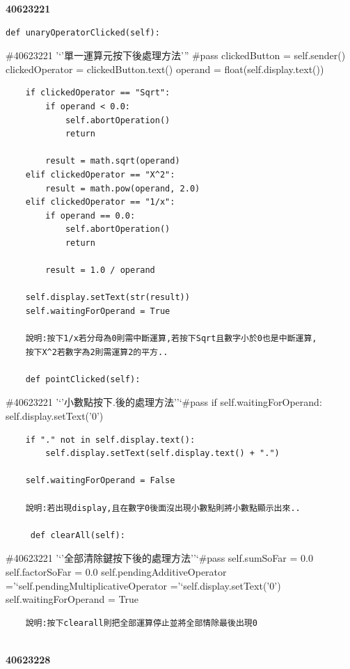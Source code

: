 \documentclass[12pt,,]{report}
\begin{document}
\textbf{40623221}

\begin{verbatim}
def unaryOperatorClicked(self):
\end{verbatim}

\#40623221 '`'單一運算元按下後處理方法''' \#pass clickedButton =
self.sender() clickedOperator = clickedButton.text() operand =
float(self.display.text())

\begin{verbatim}
    if clickedOperator == "Sqrt":
        if operand < 0.0:
            self.abortOperation()
            return

        result = math.sqrt(operand)
    elif clickedOperator == "X^2":
        result = math.pow(operand, 2.0)
    elif clickedOperator == "1/x":
        if operand == 0.0:
            self.abortOperation()
            return

        result = 1.0 / operand

    self.display.setText(str(result))
    self.waitingForOperand = True
    
    說明:按下1/x若分母為0則需中斷運算,若按下Sqrt且數字小於0也是中斷運算,
    按下X^2若數字為2則需運算2的平方..
    
    def pointClicked(self):
\end{verbatim}

\#40623221 '`'小數點按下.後的處理方法''`\#pass if
self.waitingForOperand: self.display.setText('0')

\begin{verbatim}
    if "." not in self.display.text():
        self.display.setText(self.display.text() + ".")

    self.waitingForOperand = False
    
    說明:若出現display,且在數字0後面沒出現小數點則將小數點顯示出來..
    
     def clearAll(self):
\end{verbatim}

\#40623221 '`'全部清除鍵按下後的處理方法''`\#pass self.sumSoFar = 0.0
self.factorSoFar = 0.0 self.pendingAdditiveOperator
='`self.pendingMultiplicativeOperator ='`self.display.setText('0')
self.waitingForOperand = True

\begin{verbatim}
    說明:按下clearall則把全部運算停止並將全部情除最後出現0
    
\end{verbatim}

\textbf{40623228}
\end{document}
